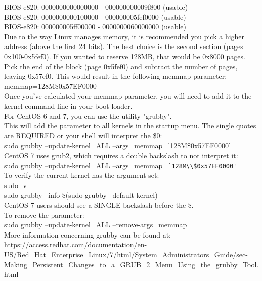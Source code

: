 \begin{flushleft}
 BIOS-e820: 0000000000000000 - 000000000009f800 (usable)\\
 BIOS-e820: 0000000000100000 - 000000005fef0000 (usable)\\
 BIOS-e820: 000000005ff00000 - 0000000060000000 (usable)\\

Due to the way Linux manages memory, it is recommended you pick a higher
address (above the first 24 bits).  The best choice is the second section
(pages 0x100-0x5fef0).  If you wanted to reserve 128MB, that would be
0x8000 pages.  Pick the end of the block (page 0x5fef0) and subtract the
number of pages, leaving 0x57ef0.  This would result in the following memmap
parameter: \\

	memmap=128M\$0x57EF0000 \\

Once you've calculated your memmap parameter, you will need to add it to the
kernel command line in your boot loader. \\

For CentOS 6 and 7, you can use the utility "grubby". \\

This will add the parameter to all kernels in the startup menu. The single
quotes are REQUIRED or your shell will interpret the \$0: \\

sudo grubby --update-kernel=ALL --args=memmap='128M\$0x57EF0000' \\

CentOS 7 uses grub2, which requires a double backslash to not interpret it:\\

sudo grubby --update-kernel=ALL --args=memmap=\verb+`128M\\$0x57EF0000'+ \\

To verify the current kernel has the argument set:\\
sudo -v\\
sudo grubby --info \$(sudo grubby --default-kernel)\\

CentOS 7 users should see a SINGLE backslash before the \$. \\

To remove the parameter:\\
sudo grubby --update-kernel=ALL --remove-args=memmap\\

More information concerning grubby can be found at:\\
https://access.redhat.com/documentation/en-US/Red\_Hat\_Enterprise\_Linux/7/html/System\_Administrators\_Guide/sec-Making\_Persistent\_Changes\_to\_a\_GRUB\_2\_Menu\_Using\_the\_grubby\_Tool.html\\


\end{flushleft}
